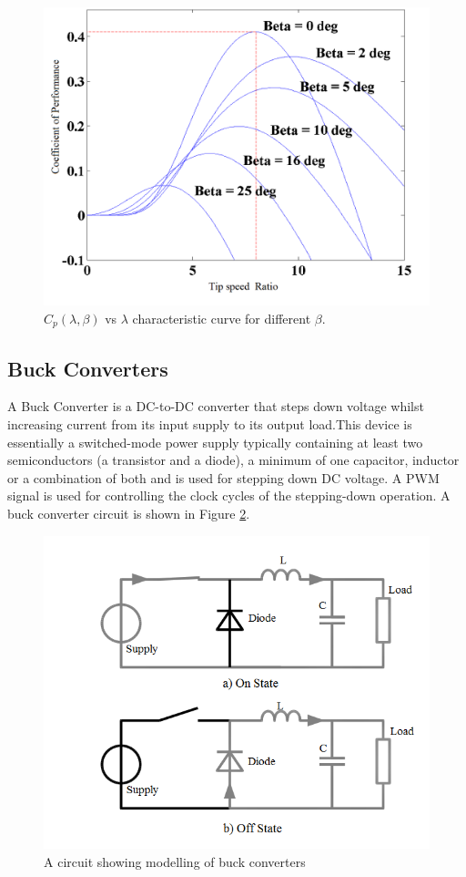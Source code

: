 \begin{center} \begin{figure}
\includegraphics[width=12cm,keepaspectratio]{3.png}
\caption{$C_p(\lambda,\beta)$ vs $\lambda$ characteristic curve for different $\beta$. \cite{RefJ11}}
\label{Figure:3}    
\end{figure} \end{center}
\subsection{Buck Converters}
A Buck Converter\cite{RefJ12} is a DC-to-DC converter that steps down voltage whilst increasing current from its input supply to its output load.This device is essentially a switched-mode power supply typically containing at least two semiconductors (a transistor and a diode), a minimum of one capacitor, inductor or a combination of both and is used for stepping down DC voltage. A PWM signal is used for controlling the clock cycles of the stepping-down operation. A buck converter circuit is shown in Figure \ref{Figure:4}.
\begin{center}
\begin{figure}
\includegraphics[width=12cm,keepaspectratio]{4.png}
\caption{ A circuit showing modelling of buck converters  \cite{RefJ12}}
\label{Figure:4}    
\end{figure}
\end{center}
